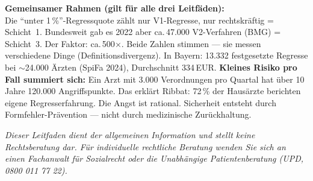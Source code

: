 \documentclass[a4paper]{umbruch-position}
\begin{document}
\vspace{1cm}

\begin{infobox}
\textbf{Gemeinsamer Rahmen (gilt f\"ur alle drei Leitf\"aden):}\\
Die ``unter 1\,\%''-Regressquote z\"ahlt nur V1-Regresse, nur rechtskr\"aftig = Schicht~1. Bundesweit gab es 2022 aber ca.\,47.000 V2-Verfahren (BMG) = Schicht~3. Der Faktor: ca.\,500$\times$. Beide Zahlen stimmen --- sie messen verschiedene Dinge (Definitionsdivergenz). In Bayern: 13.332 festgesetzte Regresse bei $\sim$24.000 \"Arzten (SpiFa 2024), Durchschnitt 334\,EUR. \textbf{Kleines Risiko pro Fall summiert sich:} Ein Arzt mit 3.000 Verordnungen pro Quartal hat \"uber 10 Jahre 120.000 Angriffspunkte. Das erkl\"art Ribbat: 72\,\% der Haus\"arzte berichten eigene Regresserfahrung. Die Angst ist rational. Sicherheit entsteht durch Formfehler-Pr\"avention --- nicht durch medizinische Zur\"uckhaltung.
\end{infobox}

\vfill
\begin{center}
\footnotesize{\textit{Dieser Leitfaden dient der allgemeinen Information und stellt keine Rechtsberatung dar. F\"ur individuelle rechtliche Beratung wenden Sie sich an einen Fachanwalt f\"ur Sozialrecht oder die Unabh\"angige Patientenberatung (UPD, 0800 011 77 22).}}
\end{center}
\end{document}
